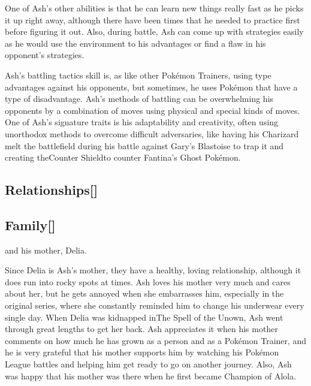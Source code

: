 \documentclass[a4paper,12pt]{article}
\begin{document}
One of Ash's other abilities is that he can learn new things really fast as he picks it up right away, although there have been times that he needed to practice first before figuring it out. Also, during battle, Ash can come up with strategies easily as he would use the environment to his advantages or find a flaw in his opponent's strategies.\\ \par \vspace{0.5cm}

Ash's battling tactics skill is, as like other Pokémon Trainers, using type advantages against his opponents, but sometimes, he uses Pokémon that have a type of disadvantage. Ash's methods of battling can be overwhelming his opponents by a combination of moves using physical and special kinds of moves. One of Ash's signature traits is his adaptability and creativity, often using unorthodox methods to overcome difficult adversaries, like having his Charizard melt the battlefield during his battle against Gary's Blastoise to trap it and creating theCounter Shieldto counter Fantina's Ghost Pokémon.\\ \par \vspace{0.5cm}

\subsection*{Relationships[]}\n\n\subsection*{Family[]}\n\nAsh and his mother, Delia.\\ \par \vspace{0.5cm}

Since Delia is Ash's mother, they have a healthy, loving relationship, although it does run into rocky spots at times. Ash loves his mother very much and cares about her, but he gets annoyed when she embarrasses him, especially in the original series, where she constantly reminded him to change his underwear every single day. When Delia was kidnapped inThe Spell of the Unown, Ash went through great lengths to get her back. Ash appreciates it when his mother comments on how much he has grown as a person and as a Pokémon Trainer, and he is very grateful that his mother supports him by watching his Pokémon League battles and helping him get ready to go on another journey. Also, Ash was happy that his mother was there when he first became Champion of Alola.\\ \par \vspace{0.5cm}
\end{document}

